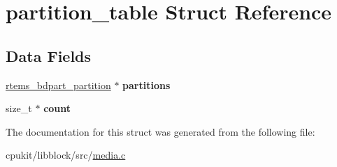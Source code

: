 \hypertarget{structpartition__table}{}\section{partition\+\_\+table Struct Reference}
\label{structpartition__table}
\subsection*{Data Fields}
\begin{DoxyCompactItemize}
\item 
\mbox{\label{structpartition__table_a90b2a114ff7c2f2ee83054415d66585e}} 
\mbox{\hyperlink{structrtems__bdpart__partition}{rtems\+\_\+bdpart\+\_\+partition}} $\ast$ {\bfseries partitions}
\item 
\mbox{\label{structpartition__table_a13f3cc2e141aced6c03238446030c54a}} 
size\+\_\+t $\ast$ {\bfseries count}
\end{DoxyCompactItemize}


The documentation for this struct was generated from the following file\+:\begin{DoxyCompactItemize}
\item 
cpukit/libblock/src/\mbox{\hyperlink{media_8c}{media.\+c}}\end{DoxyCompactItemize}
